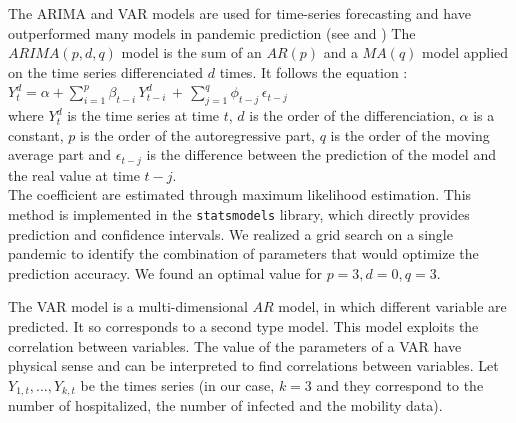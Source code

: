 The ARIMA and VAR models are used for time-series forecasting and have outperformed many models in pandemic prediction (see \cite{kufel2020arima} and \cite{shang2021regional})
The $ARIMA(p, d, q)$ model is the sum of an $AR(p)$ and a $MA(q)$ model applied on the time series differenciated $d$ times. 
It follows the equation : \\
$Y_{t}^{d}=\alpha+\sum_{i=1}^{p}\beta_{t-i}\,Y_{t-i}^{d}\,+\,\sum_{j=1}^{q}\phi_{t-j}\,\epsilon_{t-j} \label{eq:arima}$\\ 
where $Y_{t}^{d}$ is the time series at time $t$, $d$ is the order of the differenciation, $\alpha$ is a constant, $p$ is the order of the autoregressive part, $q$ is the order of the moving average part and $\epsilon_{t-j}$ is the difference between the prediction of the model and the real value at time $t-j$.\\
The coefficient are estimated through maximum likelihood estimation. 
This method is implemented in the \texttt{statsmodels} library, which directly provides prediction and confidence intervals.
We realized a grid search on a single pandemic to identify the combination of parameters that would optimize the prediction accuracy. 
We found an optimal value for $p= 3, d=0, q=3$. 

The VAR model is a multi-dimensional $AR$ model, in which different variable are predicted. 
It so corresponds to a second type model. 
This model exploits the correlation between variables. 
The value of the parameters of a VAR have physical sense and can be interpreted to find correlations between variables. 
Let $Y_{1,t}, ..., Y_{k,t}$ be the times series (in our case, $k=3$ and they correspond to the number of hospitalized, the number of infected and the mobility data).




